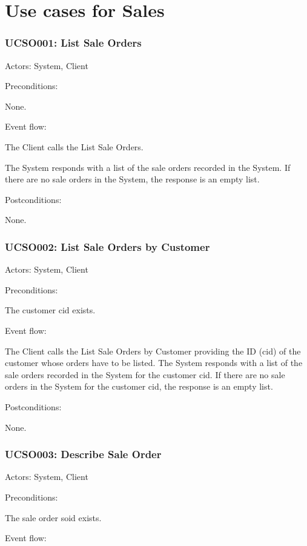 \section{Use cases for Sales}

\subsubsection{UCSO001: List Sale Orders}
\label{UCSO001}

Actors: System, Client

Preconditions:

\ucitem None.

Event flow:

\ucitem The Client calls the List Sale Orders.

\ucitem The System responds with a list of the sale orders recorded in the System. If there are no sale orders in the System, the response is an empty list.

Postconditions: 

\ucitem None.

\subsubsection{UCSO002: List Sale Orders by Customer}
\label{UCSO002}

Actors: System, Client

Preconditions:

\ucitem The customer cid exists.

Event flow:

\ucitem The Client calls the List Sale Orders by Customer providing the ID (cid) of the customer whose orders have to be listed.
\ucitem The System responds with a list of the sale orders recorded in the System for the customer cid. If there are no sale orders in the System for the customer cid, the 
response is an empty list.

Postconditions: 

\ucitem None.

\subsubsection{UCSO003: Describe Sale Order}
\label{UCSO003}

Actors: System, Client

Preconditions: 

\ucitem The sale order soid exists.

Event flow:

